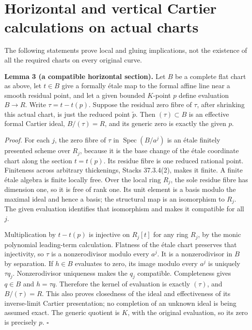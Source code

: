 \documentclass[
  11pt,
]{article}
\begin{document}
\section{Horizontal and vertical Cartier calculations on actual
charts}\label{horizontal-and-vertical-cartier-calculations-on-actual-charts}

The following statements prove local and gluing implications, not the
existence of all the required charts on every original curve.

\textbf{Lemma 3 (a compatible horizontal section).} Let \(B\) be a
complete flat chart as above, let \(t\in B\) give a formally étale map
to the formal affine line near a smooth residual point, and let a given
bounded \(K\)-point \(p\) define evaluation \(B\to R\). Write
\(\tau=t-t(p)\). Suppose the residual zero fibre of \(\tau\), after
shrinking this actual chart, is just the reduced point \(\widetilde p\).
Then \((\tau)\subset B\) is an effective formal Cartier ideal,
\(B/(\tau)=R\), and its generic zero is exactly the given \(p\).

\emph{Proof.} For each \(j\), the zero fibre of \(\tau\) in
\(\operatorname{Spec}(B/a^j)\) is an étale finitely presented scheme
over \(R_j\), because it is the base change of the étale coordinate
chart along the section \(t=t(p)\). Its residue fibre is one reduced
rational point. Finiteness across arbitrary thickenings, Stacks
37.3.4(2), makes it finite. A finite étale algebra is finite locally
free. Over the local ring \(R_j\), the sole residue fibre has dimension
one, so it is free of rank one. Its unit element is a basis modulo the
maximal ideal and hence a basis; the structural map is an isomorphism to
\(R_j\). The given evaluation identifies that isomorphism and makes it
compatible for all \(j\).

Multiplication by \(t-t(p)\) is injective on \(R_j[t]\) for any ring
\(R_j\), by the monic polynomial leading-term calculation. Flatness of
the étale chart preserves that injectivity, so \(\tau\) is a
nonzerodivisor modulo every \(a^j\). It is a nonzerodivisor in \(B\) by
separation. If \(h\in B\) evaluates to zero, its image modulo every
\(a^j\) is uniquely \(\tau q_j\). Nonzerodivisor uniqueness makes the
\(q_j\) compatible. Completeness gives \(q\in B\) and \(h=\tau q\).
Therefore the kernel of evaluation is exactly \((\tau)\), and
\(B/(\tau)=R\). This also proves closedness of the ideal and
effectiveness of its inverse-limit Cartier presentation; no completion
of an unknown ideal is being assumed exact. The generic quotient is
\(K\), with the original evaluation, so its zero is precisely \(p\).
\(\square\)
\end{document}
